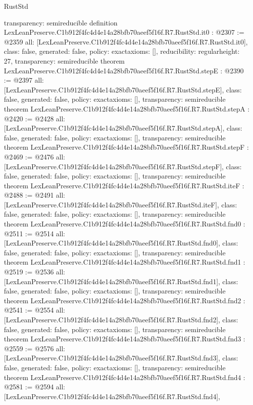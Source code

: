 \begin{lexlean}{RustStd}
\begin{coremodule}
{  transparency: semireducible
}
definition LexLeanPreserve.C1b912f4fc4d4e14a28bfb70aeef5f16f.R7.RustStd.it0 : @2307 := @2359 {
  all: [LexLeanPreserve.C1b912f4fc4d4e14a28bfb70aeef5f16f.R7.RustStd.it0],
  class: false,
  generated: false,
  policy: exact{axioms: []},
  reducibility: regular{height: 27},
  transparency: semireducible
}
theorem LexLeanPreserve.C1b912f4fc4d4e14a28bfb70aeef5f16f.R7.RustStd.stepE : @2390 := @2397 {
  all: [LexLeanPreserve.C1b912f4fc4d4e14a28bfb70aeef5f16f.R7.RustStd.stepE],
  class: false,
  generated: false,
  policy: exact{axioms: []},
  transparency: semireducible
}
theorem LexLeanPreserve.C1b912f4fc4d4e14a28bfb70aeef5f16f.R7.RustStd.stepA : @2420 := @2428 {
  all: [LexLeanPreserve.C1b912f4fc4d4e14a28bfb70aeef5f16f.R7.RustStd.stepA],
  class: false,
  generated: false,
  policy: exact{axioms: []},
  transparency: semireducible
}
theorem LexLeanPreserve.C1b912f4fc4d4e14a28bfb70aeef5f16f.R7.RustStd.stepF : @2469 := @2476 {
  all: [LexLeanPreserve.C1b912f4fc4d4e14a28bfb70aeef5f16f.R7.RustStd.stepF],
  class: false,
  generated: false,
  policy: exact{axioms: []},
  transparency: semireducible
}
theorem LexLeanPreserve.C1b912f4fc4d4e14a28bfb70aeef5f16f.R7.RustStd.iteF : @2488 := @2491 {
  all: [LexLeanPreserve.C1b912f4fc4d4e14a28bfb70aeef5f16f.R7.RustStd.iteF],
  class: false,
  generated: false,
  policy: exact{axioms: []},
  transparency: semireducible
}
theorem LexLeanPreserve.C1b912f4fc4d4e14a28bfb70aeef5f16f.R7.RustStd.fnd0 : @2511 := @2514 {
  all: [LexLeanPreserve.C1b912f4fc4d4e14a28bfb70aeef5f16f.R7.RustStd.fnd0],
  class: false,
  generated: false,
  policy: exact{axioms: []},
  transparency: semireducible
}
theorem LexLeanPreserve.C1b912f4fc4d4e14a28bfb70aeef5f16f.R7.RustStd.fnd1 : @2519 := @2536 {
  all: [LexLeanPreserve.C1b912f4fc4d4e14a28bfb70aeef5f16f.R7.RustStd.fnd1],
  class: false,
  generated: false,
  policy: exact{axioms: []},
  transparency: semireducible
}
theorem LexLeanPreserve.C1b912f4fc4d4e14a28bfb70aeef5f16f.R7.RustStd.fnd2 : @2541 := @2554 {
  all: [LexLeanPreserve.C1b912f4fc4d4e14a28bfb70aeef5f16f.R7.RustStd.fnd2],
  class: false,
  generated: false,
  policy: exact{axioms: []},
  transparency: semireducible
}
theorem LexLeanPreserve.C1b912f4fc4d4e14a28bfb70aeef5f16f.R7.RustStd.fnd3 : @2559 := @2576 {
  all: [LexLeanPreserve.C1b912f4fc4d4e14a28bfb70aeef5f16f.R7.RustStd.fnd3],
  class: false,
  generated: false,
  policy: exact{axioms: []},
  transparency: semireducible
}
theorem LexLeanPreserve.C1b912f4fc4d4e14a28bfb70aeef5f16f.R7.RustStd.fnd4 : @2581 := @2594 {
  all: [LexLeanPreserve.C1b912f4fc4d4e14a28bfb70aeef5f16f.R7.RustStd.fnd4],
}
\end{coremodule}
\end{lexlean}
